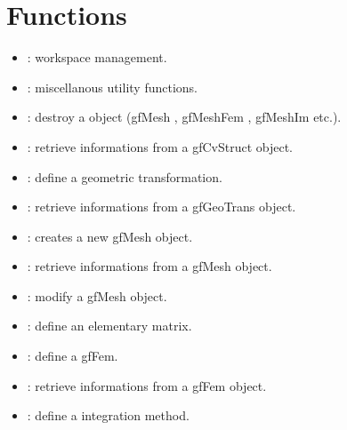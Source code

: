 \documentclass[a4paper,11pt,english]{sphinxmanual}
\begin{document}
\section{Functions}
\label{\detokenize{matlab_octave/mlabgf:functions}}\begin{itemize}
\item {} 
\sphinxAtStartPar
{} : workspace management.

\item {} 
\sphinxAtStartPar
{} : miscellanous utility functions.

\item {} 
\sphinxAtStartPar
{} : destroy a  object (gfMesh , gfMeshFem , gfMeshIm etc.).

\item {} 
\sphinxAtStartPar
{} : retrieve informations from a gfCvStruct object.

\item {} 
\sphinxAtStartPar
{} : define a geometric transformation.

\item {} 
\sphinxAtStartPar
{} : retrieve informations from a gfGeoTrans object.

\item {} 
\sphinxAtStartPar
{} : creates a new gfMesh object.

\item {} 
\sphinxAtStartPar
{} : retrieve informations from a gfMesh object.

\item {} 
\sphinxAtStartPar
{} : modify a gfMesh object.

\item {} 
\sphinxAtStartPar
{} : define an elementary matrix.

\item {} 
\sphinxAtStartPar
{} : define a gfFem.

\item {} 
\sphinxAtStartPar
{} : retrieve informations from a gfFem object.

\item {} 
\sphinxAtStartPar
{} : define a integration method.


\end{itemize}
\end{document}
